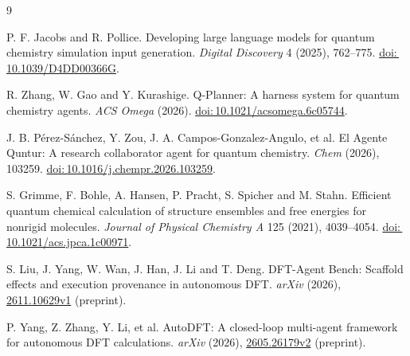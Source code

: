 \documentclass[12pt,a4paper]{article}
\newcommand{\doi}[1]{\href{https://doi.org/#1}{doi:\,#1}}
\begin{document}
\clearpage
\renewcommand{\bibsection}{\section{References}}
\setlength{\bibsep}{0.65em}
\begin{thebibliography}{9}
\raggedright
{}
P. F. Jacobs and R. Pollice. Developing large language models for quantum
chemistry simulation input generation. \emph{Digital Discovery} 4 (2025),
762--775. \doi{10.1039/D4DD00366G}.

R. Zhang, W. Gao and Y. Kurashige. Q-Planner: A harness system for quantum
chemistry agents. \emph{ACS Omega} (2026). \doi{10.1021/acsomega.6c05744}.

J. B. P\'erez-S\'anchez, Y. Zou, J. A. Campos-Gonzalez-Angulo, et al.
El Agente Quntur: A research collaborator agent for quantum chemistry.
\emph{Chem} (2026), 103259. \doi{10.1016/j.chempr.2026.103259}.

S. Grimme, F. Bohle, A. Hansen, P. Pracht, S. Spicher and M. Stahn.
Efficient quantum chemical calculation of structure ensembles and free
energies for nonrigid molecules. \emph{Journal of Physical Chemistry A}
125 (2021), 4039--4054. \doi{10.1021/acs.jpca.1c00971}.

S. Liu, J. Yang, W. Wan, J. Han, J. Li and T. Deng. DFT-Agent Bench:
Scaffold effects and execution provenance in autonomous DFT.
\emph{arXiv} (2026), \href{https://arxiv.org/abs/2611.10629v1}{2611.10629v1}
(preprint).

P. Yang, Z. Zhang, Y. Li, et al. AutoDFT: A closed-loop multi-agent framework
for autonomous DFT calculations. \emph{arXiv} (2026),
\href{https://arxiv.org/abs/2605.26179v2}{2605.26179v2} (preprint).
\end{thebibliography}
\end{document}
